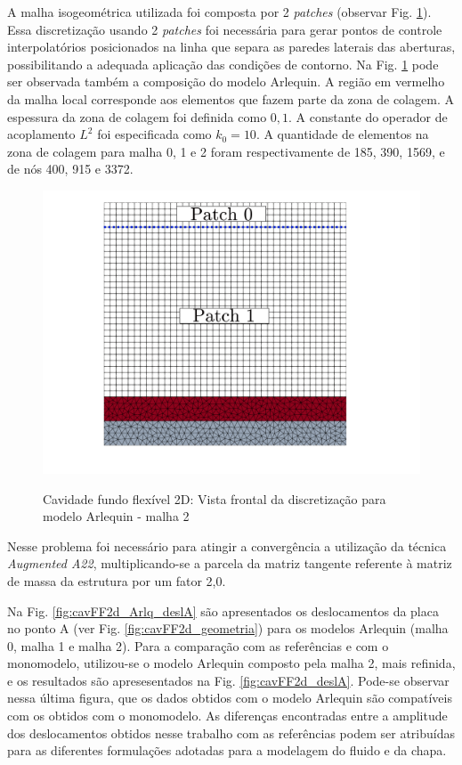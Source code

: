 \documentclass[tese_patricia]{subfiles}
\begin{document}
A malha isogeométrica utilizada foi composta por 2 \textit{patches} (observar Fig. \ref{fig:cavFF2d_malha}). Essa discretização usando 2 \textit{patches} foi necessária para gerar pontos de controle interpolatórios posicionados na linha que separa as paredes laterais das aberturas, possibilitando a adequada aplicação das condições de contorno. Na Fig. \ref{fig:cavFF2d_malha} pode ser observada também a composição do modelo Arlequin. A região em vermelho da malha local corresponde aos elementos que fazem parte da zona de colagem.  A espessura da zona de colagem foi definida como $0,1$. A constante do operador de acoplamento $L^{2}$ foi especificada como $k_{0} = 10$. A quantidade de elementos na zona de colagem para malha 0, 1 e 2  foram respectivamente de 185, 390, 1569, e de nós 400, 915 e 3372.

\begin{figure}[htb!]
	\centering
	{\includegraphics[scale=0.2,trim=0cm 2cm 0cm 0cm, clip=true]{Imagens/Cap7/cavFF2d_malha.pdf}} 
	\caption{Cavidade fundo flexível 2D: Vista frontal da discretização para modelo Arlequin - malha 2}
	\label{fig:cavFF2d_malha}
\end{figure}


Nesse problema foi necessário para atingir a convergência a utilização da técnica \textit{Augmented A22}, multiplicando-se a parcela da matriz tangente referente à matriz de massa da estrutura por um fator 2,0.

Na Fig. \ref{fig:cavFF2d_Arlq_deslA} são apresentados os deslocamentos da placa no ponto A (ver Fig. \ref{fig:cavFF2d_geometria}) para os modelos Arlequin (malha 0, malha 1 e malha 2). Para a comparação com as referências e com o monomodelo, utilizou-se o modelo Arlequin composto pela malha 2, mais refinida, e os resultados são apresesentados na Fig. \ref{fig:cavFF2d_deslA}. Pode-se observar nessa última figura, que os dados obtidos com o modelo Arlequin são compatíveis com os obtidos com o monomodelo. As diferenças encontradas entre a amplitude dos deslocamentos obtidos nesse trabalho com as referências podem ser atribuídas para as diferentes formulações adotadas para a modelagem do fluido e da chapa.
\end{document}
